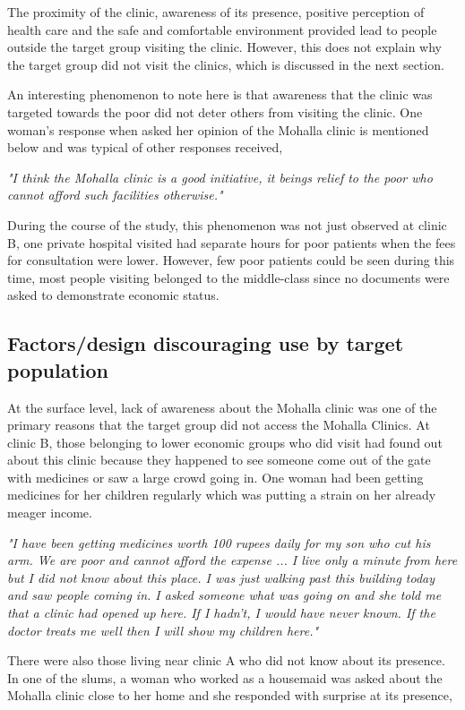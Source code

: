 The proximity of the clinic, awareness of its presence, positive perception of health care and the safe and comfortable environment provided lead to people outside the target group visiting the clinic. However, this does not explain why the target group did not visit the clinics, which is discussed in the next section. 

An interesting phenomenon to note here is that awareness that the clinic was targeted towards the poor did not deter others from visiting the clinic. One woman's response when asked her opinion of the Mohalla clinic is mentioned below and was typical of other responses received, 

\textit{"I think the Mohalla clinic is a good initiative, it beings relief to the poor who cannot afford such facilities otherwise."}

During the course of the study, this phenomenon was not just observed at clinic B, one private hospital visited had separate hours for poor patients when the fees for consultation were lower. However, few poor patients could be seen during this time, most people visiting belonged to the middle-class since no documents were asked to demonstrate economic status.

\subsection{Factors/design discouraging use by target population} %
At the surface level, lack of awareness about the Mohalla clinic was one of the primary reasons that the target group did not access the Mohalla Clinics. At clinic B, those belonging to lower economic groups who did visit had found out about this clinic because they happened to see someone come out of the gate with medicines or saw a large crowd going in. One woman had been getting medicines for her children regularly which was putting a strain on her already meager income. 

\textit{"I have been getting medicines worth 100 rupees daily for my son who cut his arm. We are poor and cannot afford the expense ... I live only a minute from here but I did not know about this place. I was just walking past this building today and saw people coming in. I asked someone what was going on and she told me that a clinic had opened up here. If I hadn't, I would have never known. If the doctor treats me well then I will show my children here."}

There were also those living near clinic A who did not know about its presence. In one of the slums, a woman who worked as a housemaid was asked about the Mohalla clinic close to her home and she responded with surprise at its presence,

